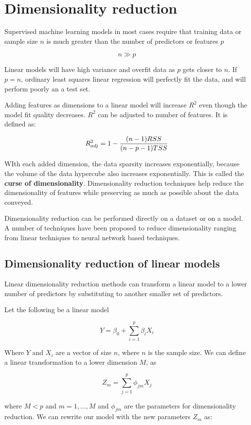 \chapter{Dimensionality reduction}

Supervised machine learning models in most cases require that training data or sample size \(n\) is much greater than the number of predictors or features \(p\)

\[n \gg p\]

Linear models will have high variance and overfit data as \(p\) gets closer to \(n\). If \(p = n\), ordinary least squares linear regression will perfectly fit the data, and will perform poorly an a test set.

Adding features as dimensions to a linear model will increase \(R^2\) even though the model fit quality decreases. \(R^2\) can be adjusted to number of features. It is defined as:

\[R^2_{adj} = 1 - {(n-1)RSS \over (n - p - 1)TSS}\]

WIth each added dimension, the data sparsity increases exponentially, because the volume of the data hypercube also increases exponentially. This is called the \textbf{curse of dimensionality}. Dimensionality reduction techniques help reduce the dimensionality of features while preserving as much as possible about the data conveyed.

Dimensionality reduction can be performed directly on a dataset or on a model. A number of techniques have been proposed to reduce dimensionality ranging from linear techniques to neural network based techniques.

\section{Dimensionality reduction of linear models}

Linear dimensionality reduction methods can transform a linear model to a lower number of predictors by substituting to another smaller set of predictors.

Let the following be a linear model

\[Y = \beta_0 + \sum_{i=1}^p\beta_iX_i\]

Where \(Y\) and \(X_i\) are a vector of size \(n\), where \(n\) is the sample size. We can define a linear transformation to a lower dimension \(M\), as

\[Z_m = \sum_{j=1}^p \phi_{jm}X_j\]

where \(M<p\) and \(m = 1,...,M\) and \(\phi_{jm}\) are the parameters for dimensionality reduction. We can rewrite our model with the new parameters \(Z_m\) as:

